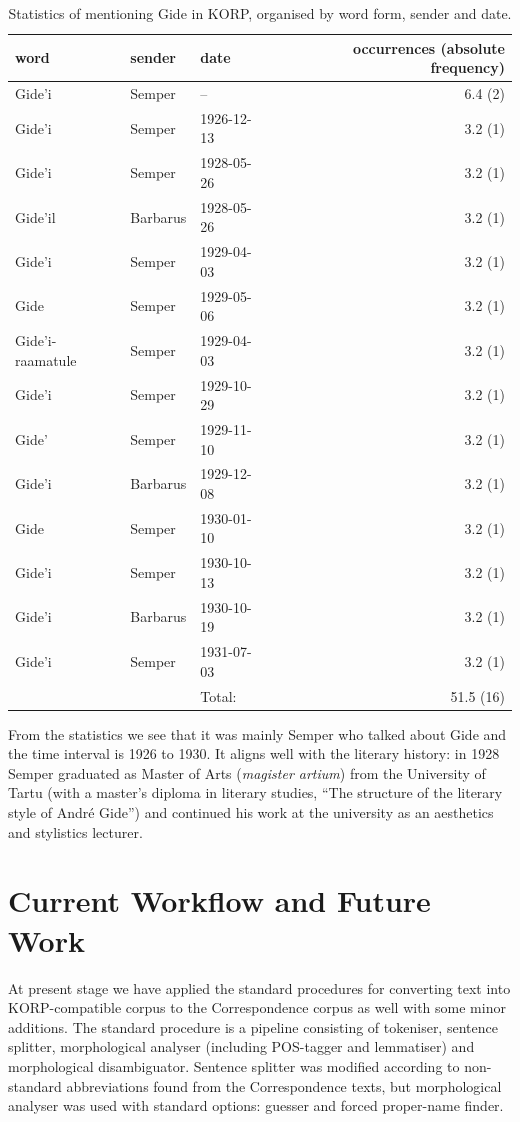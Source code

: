 \documentclass[runningheads]{llncs}
\begin{document}
\begin{table}
\caption{Statistics of mentioning Gide in KORP, organised by word form, sender and date.}\label{tab1}
\begin{tabular}{| l | l | l | r|}
  \hline
  word & sender & date & occurrences (absolute frequency) \\
  \hline
  Gide'i & Semper & -- & 6.4 (2)\\
  Gide'i & Semper & 1926-12-13 & 3.2 (1)\\
  Gide'i & Semper & 1928-05-26 & 3.2 (1)\\
  Gide'il & Barbarus & 1928-05-26 & 3.2 (1)\\
  Gide'i & Semper & 1929-04-03 & 3.2 (1)\\
  Gide & Semper & 1929-05-06 & 3.2 (1)\\
  Gide'i-raamatule & Semper & 1929-04-03 & 3.2 (1)\\
  Gide'i & Semper & 1929-10-29 & 3.2 (1)\\
  Gide' & Semper & 1929-11-10 & 3.2 (1)\\
  Gide'i & Barbarus & 1929-12-08 & 3.2 (1)\\
  Gide & Semper & 1930-01-10 & 3.2 (1)\\
  Gide'i & Semper & 1930-10-13 & 3.2 (1)\\
  Gide'i & Barbarus & 1930-10-19 & 3.2 (1)\\
  Gide'i & Semper & 1931-07-03 & 3.2 (1)\\
  \hline
  &&Total:&51.5 (16)\\
\hline
\end{tabular}
\end{table}


From the statistics we see that it was mainly Semper who talked about Gide and the time interval is 1926 to 1930. It aligns well with the literary history: in 1928 Semper graduated as Master of Arts (\emph{magister artium}) from the University of Tartu (with a master’s diploma in literary studies, ``The structure of the literary style of Andr\'e Gide'') and continued his work at the university as an aesthetics and stylistics lecturer.

\section{Current Workflow and Future Work}

At present stage we have applied the standard procedures for converting text into KORP-compatible corpus to the Correspondence corpus as well with some minor additions.  The standard procedure is a pipeline consisting of tokeniser, sentence splitter, morphological analyser (including POS-tagger and lemmatiser) and morphological disambiguator.  Sentence splitter was modified according to non-standard abbreviations found from the Correspondence texts, but morphological analyser was used with standard options: guesser and forced proper-name finder.
\end{document}

